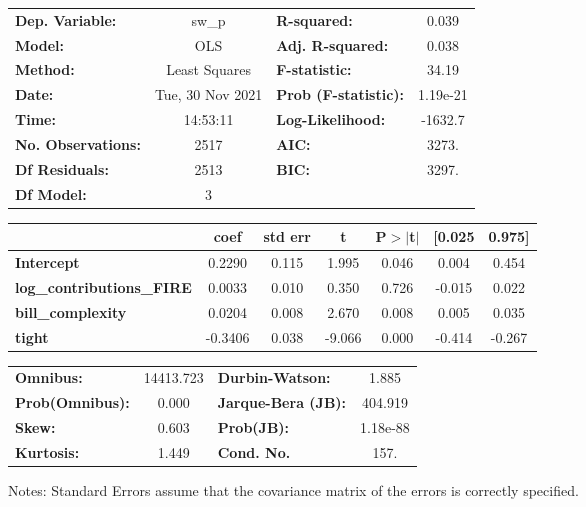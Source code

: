 \begin{center}
\begin{tabular}{lclc}
\toprule
\textbf{Dep. Variable:}           &      sw\_p       & \textbf{  R-squared:         } &     0.039   \\
\textbf{Model:}                   &       OLS        & \textbf{  Adj. R-squared:    } &     0.038   \\
\textbf{Method:}                  &  Least Squares   & \textbf{  F-statistic:       } &     34.19   \\
\textbf{Date:}                    & Tue, 30 Nov 2021 & \textbf{  Prob (F-statistic):} &  1.19e-21   \\
\textbf{Time:}                    &     14:53:11     & \textbf{  Log-Likelihood:    } &   -1632.7   \\
\textbf{No. Observations:}        &        2517      & \textbf{  AIC:               } &     3273.   \\
\textbf{Df Residuals:}            &        2513      & \textbf{  BIC:               } &     3297.   \\
\textbf{Df Model:}                &           3      & \textbf{                     } &             \\
\bottomrule
\end{tabular}
\begin{tabular}{lcccccc}
                                  & \textbf{coef} & \textbf{std err} & \textbf{t} & \textbf{P$> |$t$|$} & \textbf{[0.025} & \textbf{0.975]}  \\
\midrule
\textbf{Intercept}                &       0.2290  &        0.115     &     1.995  &         0.046        &        0.004    &        0.454     \\
\textbf{log\_contributions\_FIRE} &       0.0033  &        0.010     &     0.350  &         0.726        &       -0.015    &        0.022     \\
\textbf{bill\_complexity}         &       0.0204  &        0.008     &     2.670  &         0.008        &        0.005    &        0.035     \\
\textbf{tight}                    &      -0.3406  &        0.038     &    -9.066  &         0.000        &       -0.414    &       -0.267     \\
\bottomrule
\end{tabular}
\begin{tabular}{lclc}
\textbf{Omnibus:}       & 14413.723 & \textbf{  Durbin-Watson:     } &    1.885  \\
\textbf{Prob(Omnibus):} &    0.000  & \textbf{  Jarque-Bera (JB):  } &  404.919  \\
\textbf{Skew:}          &    0.603  & \textbf{  Prob(JB):          } & 1.18e-88  \\
\textbf{Kurtosis:}      &    1.449  & \textbf{  Cond. No.          } &     157.  \\
\bottomrule
\end{tabular}
\end{center}

Notes: \newline
 [1] Standard Errors assume that the covariance matrix of the errors is correctly specified.